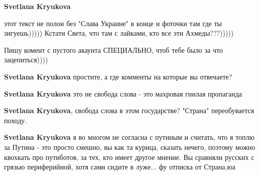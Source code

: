 \begin{itemize}
\begin{itemize}
 
\textbf{Svetlana Kryukova} 

этот текст не полон без "Слава Украине" в конце и фоточки там где ты
зигуешь))))) Кстати Света, что там с лайками, кто все эти Ахмеды???)))))

Пишу комент с пустого акаунта СПЕЦИАЛЬНО, чтоб тебе было за что зацепиться))))

 
\textbf{Svetlana Kryukova} простите, а где комменты на которые вы отвечаете?

 
\textbf{Svetlana Kryukova} это не свобода слова - это махровая гнилая пропаганда

 
\textbf{Svetlana Kryukova}, свобода слова в этом государстве? "Страна" переобувается походу.

 
\textbf{Svetlana Kryukova} я во многом не согласна с путиным и считать, что я топлю за Путина - это просто смешно, вы как та курица, сказать нечего, поэтому можно квохкать про путиботов, за тех, кто имеет другое мнение.
Вы сравняли русских с грязью периферийной, хотя сами сидите в луже...
фу отписка от Страна.юа

 

\end{itemize}
\end{itemize}
